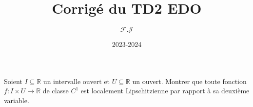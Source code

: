 \documentclass[12pt,a4paper]{article}
\title{Corrigé du TD2 EDO}
\author{$\mathcal{F.J}$}
\date{2023-2024}
\newcommand{\R}{\mathbb{R}}
\begin{document}
\maketitle
\begin{exo}
  Soient $I\subseteq\R$ un intervalle ouvert et $U\subseteq\R$ un ouvert. Montrer que toute fonction $f:I\times U\longrightarrow\R$ de classe $C^1$ est localement Lipschitzienne par rapport à sa deuxième variable.
\end{exo}

\end{document}
